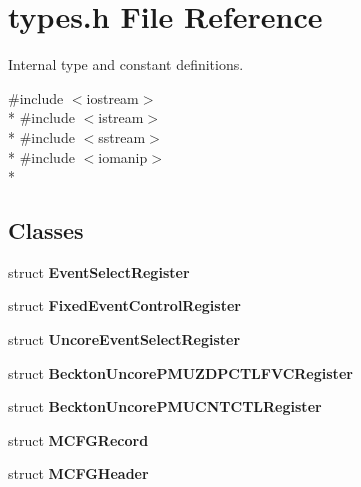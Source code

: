 \section{types.\+h File Reference}
\label{types_8h}


Internal type and constant definitions.  


{\ttfamily \#include $<$iostream$>$}\\*
{\ttfamily \#include $<$istream$>$}\\*
{\ttfamily \#include $<$sstream$>$}\\*
{\ttfamily \#include $<$iomanip$>$}\\*
\subsection*{Classes}
\begin{DoxyCompactItemize}
\item 
struct {\bf Event\+Select\+Register}
\item 
struct {\bf Fixed\+Event\+Control\+Register}
\item 
struct {\bf Uncore\+Event\+Select\+Register}
\item 
struct {\bf Beckton\+Uncore\+P\+M\+U\+Z\+D\+P\+C\+T\+L\+F\+V\+C\+Register}
\item 
struct {\bf Beckton\+Uncore\+P\+M\+U\+C\+N\+T\+C\+T\+L\+Register}
\item 
struct {\bf M\+C\+F\+G\+Record}
\item 
struct {\bf M\+C\+F\+G\+Header}
\end{DoxyCompactItemize}
